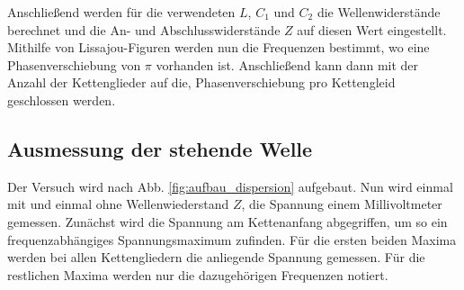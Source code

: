 Anschließend werden für die verwendeten $L$, $C_1$ und $C_2$ die Wellenwiderstände berechnet
und die An- und Abschlusswiderstände $Z$ auf diesen Wert eingestellt.
Mithilfe von Lissajou-Figuren werden nun die Frequenzen bestimmt, wo eine Phasenverschiebung von $\pi$ 
vorhanden ist. Anschließend kann dann mit der Anzahl der Kettenglieder auf die, 
Phasenverschiebung pro Kettengleid geschlossen werden.

\subsection{Ausmessung der stehende Welle}
Der Versuch wird nach Abb. \ref{fig:aufbau_dispersion} aufgebaut.
Nun wird einmal mit und einmal ohne Wellenwiederstand $Z$, die Spannung einem Millivoltmeter gemessen.
Zunächst wird die Spannung am Kettenanfang abgegriffen, um so ein frequenzabhängiges Spannungsmaximum 
zufinden. Für die ersten beiden Maxima werden bei allen Kettengliedern die anliegende Spannung gemessen.
Für die restlichen Maxima werden nur die dazugehörigen Frequenzen notiert.
